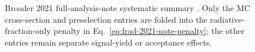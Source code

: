 \begin{figure}[H]
\centering
{}
\caption{Broader 2021 full-analysis-note systematic summary
\cite{HPS2021FullAnalysisNote}. Only the MC cross-section and preselection entries
are folded into the radiative-fraction-only penalty in
Eq.~\eqref{eq:frad-2021-note-penalty}; the other entries remain separate signal-yield
or acceptance effects.}
\label{fig:2021-syst-table-note}
\end{figure}
